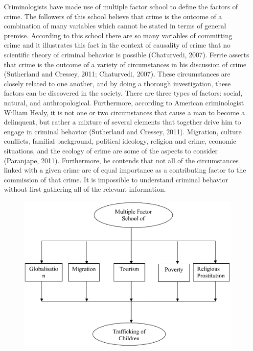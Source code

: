 \begin{multicols}{2}
\noi
Criminologists
have made use of multiple factor school to define the factors of crime. The followers
of this school believe that crime is the outcome of a combination of many variables
which cannot be stated in terms of general premise. According to this school there are
so many variables of committing crime and it illustrates this fact in the context of
causality of crime that no scientific theory of criminal behavior is possible
(Chaturvedi, 2007). Ferrie asserts that crime is the outcome of a variety of
circumstances in his discussion of crime (Sutherland and Cressey, 2011; Chaturvedi,
2007). These circumstances are closely related to one another, and by doing a thorough
investigation, these factors can be discovered in the society. There are three types of
factors: social, natural, and anthropological. Furthermore, according to American
criminologist William Healy, it is not one or two circumstances that cause a man to
become a delinquent, but rather a mixture of several elements that together drive him
to engage in criminal behavior (Sutherland and Cressey, 2011). Migration, culture
conflicts, familial background, political ideology, religion and crime, economic
situations, and the ecology of crime are some of the aspects to consider (Paranjape,
2011). Furthermore, he contends that not all of the circumstances linked with a given
crime are of equal importance as a contributing factor to the commission of that crime.
It is impossible to understand criminal behavior without first gathering all of the
relevant information.
\end{multicols}
\begin{figure}
\includegraphics[scale=1.1]{images/fig001.eps}
\end{figure}

